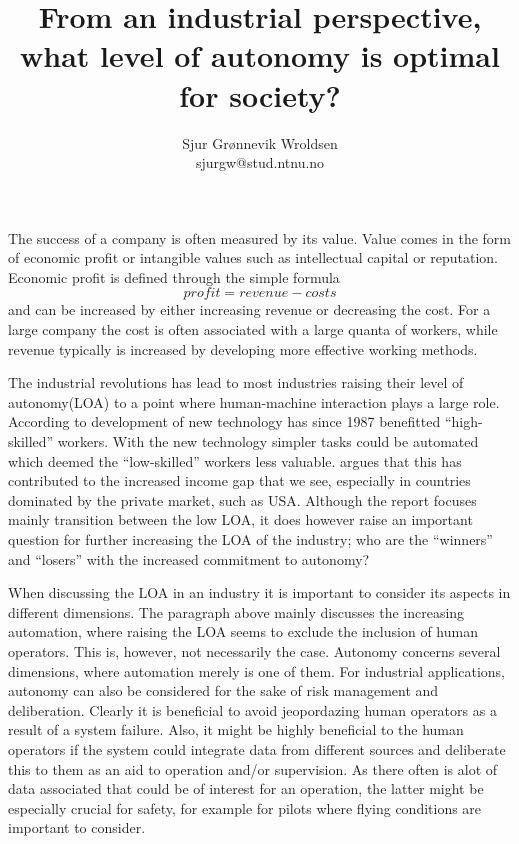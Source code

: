 \documentclass[11pt]{article}
\author{Sjur Grønnevik Wroldsen\\sjurgw@stud.ntnu.no}
\title{From an industrial perspective, what level of autonomy is optimal for society?}
\begin{document}
  \maketitle
  The success of a company is often measured by its value. Value comes in the form of economic profit or intangible values such as intellectual capital or reputation. Economic profit is defined through the simple formula 
  \begin{equation}
    profit = revenue - costs
  \end{equation}
  and can be increased by either increasing revenue or decreasing the cost. For a large company the cost is often associated with a large quanta of workers, while revenue typically is increased by developing more effective working methods.
  
  The industrial revolutions has lead to most industries raising their level of autonomy(LOA) to a point where human-machine interaction plays a large role. According to \cite{wageGapVsAutomation} development of new technology has since 1987 benefitted \enquote{high-skilled} workers. With the new technology simpler tasks could be automated which deemed the \enquote{low-skilled} workers less valuable. \cite{wageGapVsAutomation} argues that this has contributed to the increased income gap that we see, especially in countries dominated by the private market, such as USA. 
  Although the report focuses mainly transition between the low LOA, it does however raise an important question for further increasing the LOA of the industry; who are the \enquote{winners} and \enquote{losers} with the increased commitment to autonomy?
  
  When discussing the LOA in an industry it is important to consider its aspects in different dimensions. The paragraph above mainly discusses the increasing automation, where raising the LOA seems to exclude the inclusion of human operators. This is, however, not necessarily the case. Autonomy concerns several dimensions, where automation merely is one of them. For industrial applications, autonomy can also be considered for the sake of risk management and deliberation. Clearly it is beneficial to avoid jeopordazing human operators as a result of a system failure. Also, it might be highly beneficial to the human operators if the system could integrate data from different sources and deliberate this to them as an aid to operation and/or supervision. As there often is alot of data associated that could be of interest for an operation, the latter might be especially crucial for safety, for example for pilots where flying conditions are important to consider. 
  
\end{document}
